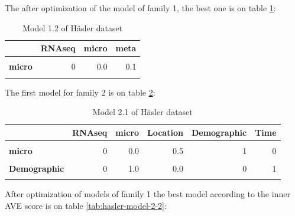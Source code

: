 \documentclass[
  a4paper,
]{book}
\begin{document}
The after optimization of the model of family 1, the best one is on table \ref{tab:hasler-model-1-2}:

\begin{table}[H]

\caption[Model 1.2 of Häsler dataset]{\label{tab:hasler-model-1-2}Model 1.2 of Häsler dataset}
\centering
\begin{tabular}[t]{|>{}l|r|r|>{}r|}
\hline
\textbf{ } & \textbf{RNAseq} & \textbf{micro} & \textbf{meta}\\
\hline
\textbf{\cellcolor{gray!6}{RNAseq}} & \cellcolor{gray!6}{0} & \cellcolor{gray!6}{0.0} & \cellcolor{gray!6}{1.0}\\
\hline
\textbf{micro} & 0 & 0.0 & 0.1\\
\hline
\textbf{\cellcolor{gray!6}{meta}} & \cellcolor{gray!6}{1} & \cellcolor{gray!6}{0.1} & \cellcolor{gray!6}{0.0}\\
\hline
\end{tabular}
\end{table}

The first model for family 2 is on table \ref{tab:hasler-model-2-1}:

\begin{table}[H]

\caption[Model 2.1 of Häsler dataset]{\label{tab:hasler-model-2-1}Model 2.1 of Häsler dataset}
\centering
\begin{tabular}[t]{|>{}l|>{}r||r|r|r|r}
\hline
\textbf{ } & \textbf{RNAseq} & \textbf{micro} & \textbf{Location} & \textbf{Demographic} & \textbf{Time}\\
\hline
\textbf{\cellcolor{gray!6}{RNAseq}} & \cellcolor{gray!6}{0} & \cellcolor{gray!6}{0.0} & \cellcolor{gray!6}{1.0} & \cellcolor{gray!6}{0} & \cellcolor{gray!6}{0}\\
\hline
\textbf{micro} & 0 & 0.0 & 0.5 & 1 & 0\\
\hline
\textbf{\cellcolor{gray!6}{Location}} & \cellcolor{gray!6}{1} & \cellcolor{gray!6}{0.5} & \cellcolor{gray!6}{0.0} & \cellcolor{gray!6}{0} & \cellcolor{gray!6}{0}\\
\hline
\textbf{Demographic} & 0 & 1.0 & 0.0 & 0 & 1\\
\hline
\textbf{\cellcolor{gray!6}{Time}} & \cellcolor{gray!6}{0} & \cellcolor{gray!6}{0.0} & \cellcolor{gray!6}{0.0} & \cellcolor{gray!6}{1} & \cellcolor{gray!6}{0}\\
\hline
\end{tabular}
\end{table}

After optimization of models of family 1 the best model according to the inner AVE score is on table \ref{tab:hasler-model-2-2}:
\end{document}
